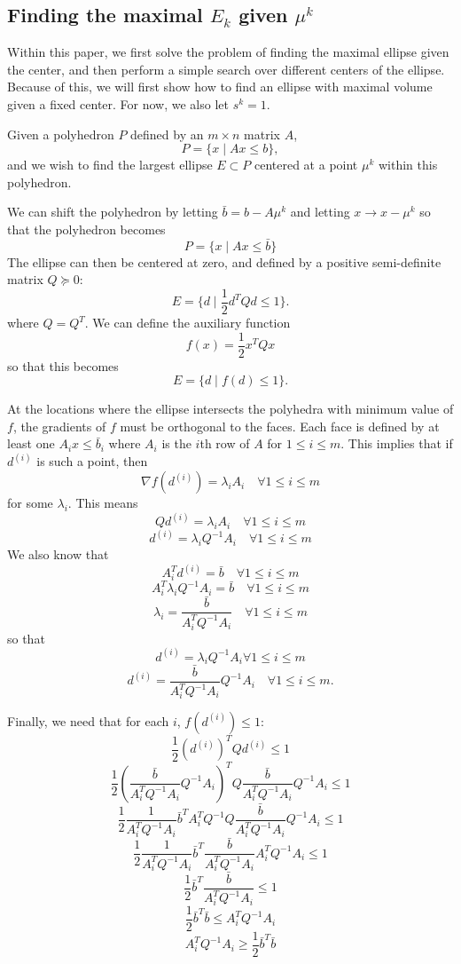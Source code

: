 \documentclass{article}
\begin{document}
\subsection{Finding the maximal $E_k$ given $\mu^k$}

\label{ellipse_optimization}

Within this paper, we first solve the problem of finding the maximal ellipse given the center, and then perform a simple search over different centers of the ellipse.
Because of this, we will first show how to find an ellipse with maximal volume given a fixed center.
For now, we also let $s^k = 1$.

Given a polyhedron $P$ defined by an $m \times n$ matrix $A$,
\[
P = \{ x \; | \;  Ax \le b \},
\]
and we wish to find the largest ellipse $E \subset P$ centered at a point $\mu^{k}$ within this polyhedron.

We can shift the polyhedron by letting $\bar{b} = b - A\mu^{k}$ and letting $x \to x - \mu^{k}$ so that the polyhedron becomes
\[
P = \{ x \; | \;  Ax \le \bar{b} \}
\]
The ellipse can then be centered at zero, and defined by a positive semi-definite matrix $Q \succeq 0$:
\[
E = \{ d \; | \; \frac 1 2 d^T Q d \le 1 \}.
\]
where $Q = Q^T$.
We can define the auxiliary function 
\[
f(x) = \frac 1 2 x^T Q x
\]
so that this becomes
\[
E = \{ d \; | \; f(d) \le 1 \}.
\]


At the locations where the ellipse intersects the polyhedra with minimum value of $f$, the gradients of $f$ must be orthogonal to the faces.
Each face is defined by at least one $A_i x \le \bar{b}_i$ where $A_i$ is the $i$th row of $A$ for $1\le i \le m$.
This implies that if $d^{(i)}$ is such a point, then
\[
\nabla f(d^{(i)}) = \lambda_i A_i \quad \forall 1\le i\le m
\]
for some $\lambda_i$.
This means
\[
Q d^{(i)} = \lambda_i A_i \quad \forall 1\le i\le m
\]
\[
d^{(i)} = \lambda_i Q^{-1}A_i \quad \forall 1\le i\le m
\]
We also know that 
\[
A_i^T d^{(i)} = \bar{b} \quad \forall 1\le i\le m
\]
\[
A_i^T \lambda_i Q^{-1}A_i = \bar{b} \quad \forall 1\le i\le m
\]
\[
\lambda_i = \frac {\bar{b}}{A_i^T  Q^{-1}A_i} \quad \forall 1\le i\le m
\]
so that 
\[
d^{(i)} = \lambda_i Q^{-1}A_i \forall 1\le i\le m
\]
\[
d^{(i)} = \frac {\bar{b}}{A_i^T  Q^{-1}A_i}  Q^{-1}A_i \quad \forall 1\le i\le m.
\]

Finally, we need that for each $i$, $f(d^{(i)}) \le 1$:
\[
\frac 1 2 (d^{(i)})^{T} Q d^{(i)} \le 1
\]
\[
\frac 1 2 (\frac {\bar{b}}{A_i^T  Q^{-1}A_i}  Q^{-1}A_i)^{T} Q \frac {\bar{b}}{A_i^T  Q^{-1}A_i}  Q^{-1}A_i \le 1
\]
\[
\frac 1 2 \frac {1}{A_i^T  Q^{-1}A_i}  \bar{b}^T A_i^T Q^{-1} Q \frac {\bar{b}}{A_i^T  Q^{-1}A_i}  Q^{-1}A_i \le 1
\]
\[
\frac 1 2 \frac {1}{A_i^T  Q^{-1}A_i}  \bar{b}^T \frac {\bar{b}}{A_i^T  Q^{-1}A_i}  A_i^T Q^{-1}A_i \le 1
\]
\[
\frac 1 2 \bar{b}^T \frac {\bar{b}}{A_i^T  Q^{-1}A_i} \le 1
\]
\[
\frac 1 2 \bar{b}^T \bar{b}\le A_i^T  Q^{-1}A_i
\]
\[
A_i^T  Q^{-1}A_i \ge \frac 1 2 \bar{b}^T \bar{b}
\]
\end{document}
